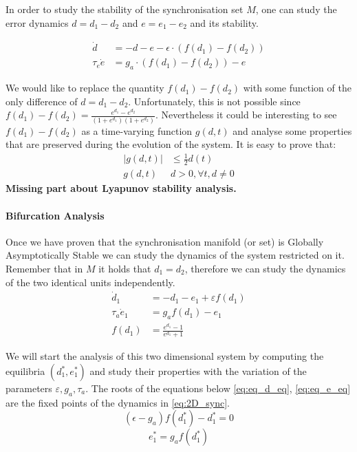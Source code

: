 In order to study the stability of the synchronisation set $M$, one can study the error dynamics $d=d_1 - d_2$ and $e= e_1 - e_2$ and its stability. 

\begin{equation} 
\begin{aligned}
\dot d &= -d - e - \epsilon \cdot (f(d_1) - f(d_2)) \\
\tau_e \dot e &= g_a \cdot (f(d_1) - f(d_2)) - e
\end{aligned}
\end{equation}


 We would like to replace the quantity $f(d_1) - f(d_2)$ with some function of the only difference of $d=d_1-d_2$. Unfortunately, this is not possible since $f(d_1)-f(d_2) = \frac{e^{d_1}-e^{d_2}}{(1+e^{d_1})(1+e^{d_2})}$. Nevertheless it could be interesting to see $f(d_1)-f(d_2)$ as a time-varying function $g(d, t)$ and analyse some properties that are preserved during the evolution of the system.
It is easy to prove that:
\begin{equation}
\begin{aligned}
|g(d,t)| &\leq \frac{1}{2}d(t) \\
g(d,t)&d>0, \forall t, d\neq0
\end{aligned}
\end{equation}
\textbf{Missing part about Lyapunov stability analysis.}

\paragraph{Bifurcation Analysis}
Once we have proven that the synchronisation manifold (or set) is Globally Asymptotically Stable we can study the dynamics of the system restricted on it. Remember that in $M$ it holds that $d_1=d_2$, therefore we can study the dynamics of the two identical units independently.  
\begin{equation}
\begin{aligned}
\dot d_{1} &= - d_1 - e_1 + \varepsilon f(d_1) \\
\tau_a \dot{e}_{1}&=g_a f(d_1) - e_{1}\\
f(d_1) &= \frac{e^{d_1}-1}{e^{d_1}+1}
\end{aligned}
\label{eq:2D_sync}
\end{equation}

We will start the analysis of this two dimensional system by computing the equilibria $(d_1^*,e_1^*)$ and study their properties with the variation of the parameters $\varepsilon, g_a, \tau_a$. The roots of the equations below \eqref{eq:eq_d_eq}, \eqref{eq:eq_e_eq}  are the fixed points of the dynamics in \eqref{eq:2D_sync}.
\begin{equation}
 (\epsilon - g_a)f(d_1^*) - d_1^* = 0
\label{eq:eq_d_eq}
\end{equation}
\begin{equation}
e_1^* = g_a f(d_1^*)
\label{eq:eq_e_eq}
\end{equation}

